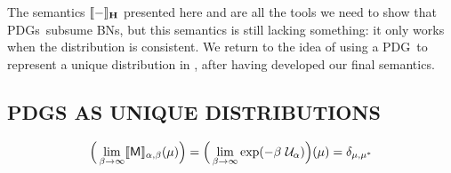 \documentclass{article}
\newcommand\MaxEnt{_{\mathbf H}}
\newcommand{\sfM}{\mathsf M}
\newcommand{\MN}{PDG}
\newcommand{\MNs}{\MN s}
\numberwithin{equation}{section}
\begin{document}
	The semantics $\bbr{-}\MaxEnt$ presented here and  are all the tools we need to show that \MNs\ subsume BNs, but this semantics is still lacking something: it only works when the distribution is consistent.
	We return to the idea of using a \MN\ to represent a unique distribution in , after having developed our final semantics. 



    \subsection{PDGS AS UNIQUE DISTRIBUTIONS}\label{sec:uniq-dist-semantics-2} 

	\[ \Big(\lim_{\beta \to \infty} \bbr{\sfM}_{\alpha,\beta}(\mu)
        \Big)  = \Big(\lim_{\beta \to \infty} \exp(-\beta\ \mathcal
        U_\alpha) \Big)(\mu) = \delta_{\mu, \mu^*} \] 
	
\end{document}
